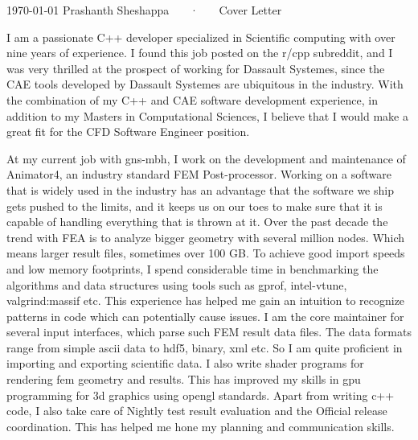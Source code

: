 \documentclass[11pt, a4paper]{awesome-cv}
\newcommand{\company}{Dassault Systemes}
\begin{document}
\makecvheader[R]

\makecvfooter
  {\today}
  {Prashanth Sheshappa ~~~·~~~ Cover Letter}
  {}

\makelettertitle

\begin{cvletter}


I am a passionate C++ developer specialized in Scientific computing with over 
nine years of experience. I found this job posted on the r/cpp subreddit, and I 
was very thrilled at the prospect of working for \company{}, since the 
CAE tools developed by \company{} are ubiquitous in the industry. \newline{}
With the combination of my C++ and CAE software development experience, in 
addition to my Masters in Computational Sciences, I believe that I would make 
a great fit for the CFD Software Engineer position.

At my current job with gns-mbh, I work on the development and maintenance of 
Animator4, an industry standard FEM Post-processor. 
Working on a software that is widely used in the industry has an advantage that 
the software we ship gets pushed to the limits, and it keeps us on our toes to 
make sure that it is capable of handling everything that is thrown at it. 
Over the past decade the trend with FEA is to analyze bigger geometry 
with several million nodes. Which means larger result files, sometimes over 100 
GB. To achieve good import speeds and low memory footprints, I spend 
considerable time in benchmarking the algorithms and data structures using tools
 such as gprof, intel-vtune, valgrind:massif etc.
This experience has helped me gain an intuition to recognize patterns in code
which can potentially cause issues.   
I am the core maintainer for several input interfaces, which parse such FEM 
result data files. The data formats range from simple ascii data to hdf5, binary, 
xml etc. So I am quite proficient in importing and exporting scientific data. 
I also write shader programs for rendering fem geometry and results. This has 
improved my skills in gpu programming for 3d graphics using opengl standards.
Apart from writing c++ code, I also take care of Nightly test result evaluation
and the Official release coordination. This has helped me hone my planning and 
communication skills.


\end{cvletter}
\end{document}
